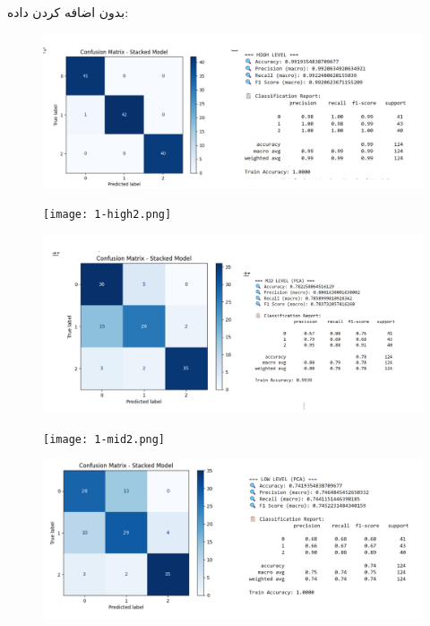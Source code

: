 \documentclass[a4paper,12pt]{article}
\begin{document}
بدون اضافه کردن داده:
\\
\begin{figure}[h]
	\centering
	\includegraphics[width=1\textwidth]{1-high.png}
\end{figure}
\FloatBarrier
\begin{figure}[h]
	\centering
	\texttt{[image: 1-high2.png]}
\end{figure}
\FloatBarrier
\begin{figure}[h]
	\centering
	\includegraphics[width=1\textwidth]{1-mid.png}
\end{figure}
\FloatBarrier
\begin{figure}[h]
	\centering
	\texttt{[image: 1-mid2.png]}
\end{figure}
\FloatBarrier
\begin{figure}[h]
	\centering
	\includegraphics[width=1\textwidth]{1-low.png}
\end{figure}
\end{document}
